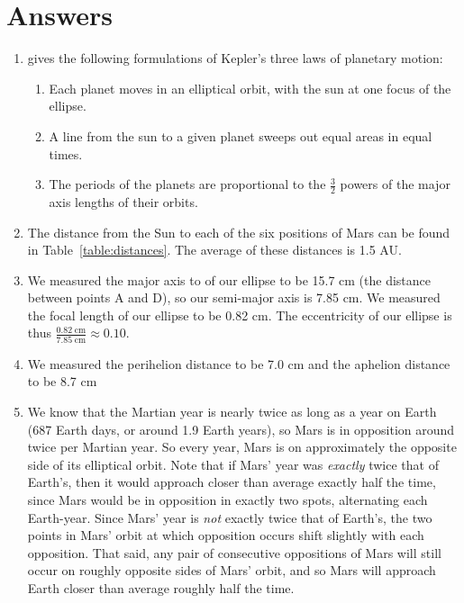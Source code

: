 \documentclass[11pt]{article}
\begin{document}
\section{Answers}
\begin{enumerate}[label={\textbf{\emph{(\arabic*)}}}]
	\item %
\cite{UniPhys} gives the following formulations of Kepler's three laws of planetary motion:
\begin{enumerate}[label=\arabic*.]
	\item %
Each planet moves in an elliptical orbit, with the sun at one focus of the ellipse.

	\item %
A line from the sun to a given planet sweeps out equal areas in equal times.

	\item %
The periods of the planets are proportional to the $\frac{3}{2}$ powers of the major axis lengths of their orbits.

\end{enumerate}

	\item %
The distance from the Sun to each of the six positions of Mars can be found in Table~\ref{table:distances}.
The average of these distances is 1.5 AU.

	\item %
We measured the major axis to of our ellipse to be 15.7 cm (the distance between points A and D), so our semi-major axis is 7.85 cm.
We measured the focal length of our ellipse to be 0.82 cm.
The eccentricity of our ellipse is thus $\frac{0.82\;\textrm{cm}}{7.85\;\textrm{cm}} \approx 0.10$.

	\item %
We measured the perihelion distance to be 7.0 cm and the aphelion distance to be 8.7 cm

	\item %
We know that the Martian year is nearly twice as long as a year on Earth (687 Earth days, or around 1.9 Earth years), so Mars is in opposition around twice per Martian year.
So every year, Mars is on approximately the opposite side of its elliptical orbit.
Note that if Mars' year was \emph{exactly} twice that of Earth's, then it would approach closer than average exactly half the time, since Mars would be in opposition in exactly two spots, alternating each Earth-year.
Since Mars' year is \emph{not} exactly twice that of Earth's, the two points in Mars' orbit at which opposition occurs shift slightly with each opposition.
That said, any pair of consecutive oppositions of Mars will still occur on roughly opposite sides of Mars' orbit, and so Mars will approach Earth closer than average roughly half the time.


\end{enumerate}
\end{document}
